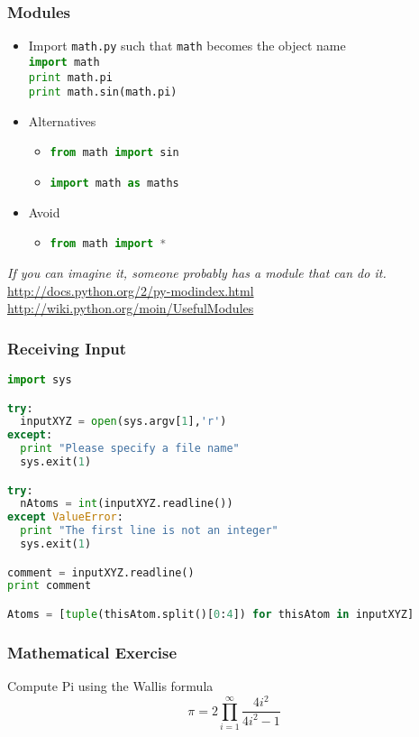 \documentclass[xcolor=table,10pt,final]{beamer}
\begin{document}
\begin{frame}
  \frametitle{Modules}
  \begin{itemize}
    \item Import {\tt math.py} such that {\tt math} becomes the object name\\
      \lstinline[language=python]|import math|\\
      \lstinline[language=python]|print math.pi|\\
      \lstinline[language=python]|print math.sin(math.pi)|
    \item Alternatives
      \begin{itemize}
        \item \lstinline[language=python]|from math import sin|
        \item \lstinline[language=python]|import math as maths|
      \end{itemize}
    \item Avoid
      \begin{itemize}
        \item \lstinline[language=python]|from math import *|
      \end{itemize}
  \end{itemize}
  \vskip1cm
{\it If you can imagine it, someone probably has a module that can do it.}\\
{\scriptsize \url{http://docs.python.org/2/py-modindex.html}}\\
{\scriptsize \url{http://wiki.python.org/moin/UsefulModules}}\\
\end{frame}

\begin{frame}[fragile]
  \frametitle{Receiving Input}
  \begin{lstlisting}[language=python]
import sys

try:
  inputXYZ = open(sys.argv[1],'r')
except:
  print "Please specify a file name"
  sys.exit(1)

try:
  nAtoms = int(inputXYZ.readline())
except ValueError:
  print "The first line is not an integer"
  sys.exit(1)

comment = inputXYZ.readline()
print comment

Atoms = [tuple(thisAtom.split()[0:4]) for thisAtom in inputXYZ]
  \end{lstlisting}

\end{frame}

\begin{frame}
  \frametitle{Mathematical Exercise}
  Compute Pi using the Wallis formula
  \vskip1cm
  \begin{equation*}
    \pi = 2\prod^{\infty}_{i=1}\frac{4i^2}{4i^2-1}
  \end{equation*}
\end{frame}
\end{document}
